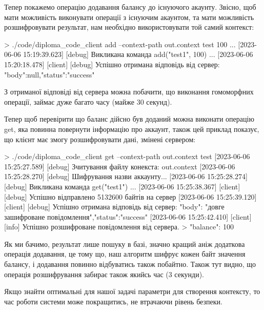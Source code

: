 Тепер покажемо операцію додавання балансу до існуючого акаунту. Звісно, щоб мати
можливість виконувати операції з існуючим акаунтом, та мати можливість розшифровувати
результат, нам необхідно використовувати той самий контекст:

\begin{spverbatim}
> ./code/diploma_code_client add --context-path out.context test 100
...
[2023-06-06 15:19:39.623] [debug] Викликана команда add("test1", 100)
...
[2023-06-06 15:20:18.478] [client] [debug] Успішно отримана відповідь від сервер: {"body":null,"status":"success"}
\end{spverbatim}

З отриманої відповіді від сервера можна побачити, що виконання гомоморфних операції, займає
дуже багато часу (майже 30 секунд).

Тепер щоб перевірити що баланс дійсно був доданий можна виконати операцію get, яка повинна 
повернути інформацію про аккаунт, також цей приклад показує, що клієнт має змогу
розшифровувати дані, змінені сервером:

\begin{spverbatim}
> ./code/diploma_code_client get --context-path out.context test
[2023-06-06 15:25:27.589] [debug] Зчитування файлу конекста: out.context
[2023-06-06 15:25:28.270] [debug] Шифрування назви аккаунту...
[2023-06-06 15:25:28.274] [debug] Викликана команда get("test1")
...
[2023-06-06 15:25:38.367] [client] [debug] Успішно відправлено 5132600 байтів на сервер
[2023-06-06 15:25:39.120] [client] [debug] Успішно отримана відповідь від сервер: {"body":
"довге зашифроване повідомлення","status":"success"}
[2023-06-06 15:25:42.410] [client] [info] Успішно розшифроване повідомлення від сервера.
> {"balance": 100}
\end{spverbatim}

Як ми бачимо, результат лише пошуку в базі, значно кращий аніж додаткова операція додавання,
це тому що, наш алгоритм шифрує кожен байт значення балансу, і додавання повинно
відбуватись також побайтно. Також тут видно, що операція розшифрування забирає також
якийсь час (3 секунди).

Якщо знайти оптимальні для нашої задачі параметри для створення контексту, то час
роботи системи може покращитись, не втрачаючи рівень безпеки.


